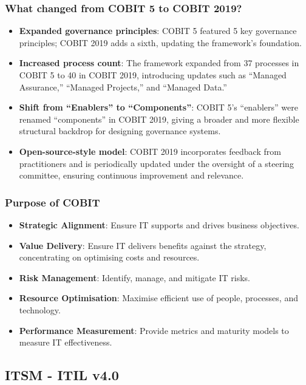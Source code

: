 \subsubsection{What changed from COBIT 5 to COBIT 2019?}

\begin{itemize}
    \item \textbf{Expanded governance principles}: COBIT 5 featured 5 key governance principles; COBIT 2019 adds a sixth, updating the framework's foundation.
    \item \textbf{Increased process count}: The framework expanded from 37 processes in COBIT 5 to 40 in COBIT 2019, introducing updates such as “Managed Assurance,” “Managed Projects,” and “Managed Data.” 
    \item \textbf{Shift from “Enablers” to “Components”}: COBIT 5’s “enablers” were renamed “components” in COBIT 2019, giving a broader and more flexible structural backdrop for designing governance systems. 
    \item \textbf{Open-source-style model}: COBIT 2019 incorporates feedback from practitioners and is periodically updated under the oversight of a steering committee, ensuring continuous improvement and relevance.
\end{itemize}

\subsubsection{Purpose of COBIT}

\begin{itemize}
    \item \textbf{Strategic Alignment}: Ensure IT supports and drives business objectives.
    \item \textbf{Value Delivery}: Ensure IT delivers benefits against the strategy, concentrating on optimising costs and resources.
    \item \textbf{Risk Management}: Identify, manage, and mitigate IT risks.
    \item \textbf{Resource Optimisation}: Maximise efficient use of people, processes, and technology.
    \item \textbf{Performance Measurement}: Provide metrics and maturity models to measure IT effectiveness.
\end{itemize}

\subsection{ITSM - ITIL v4.0}


